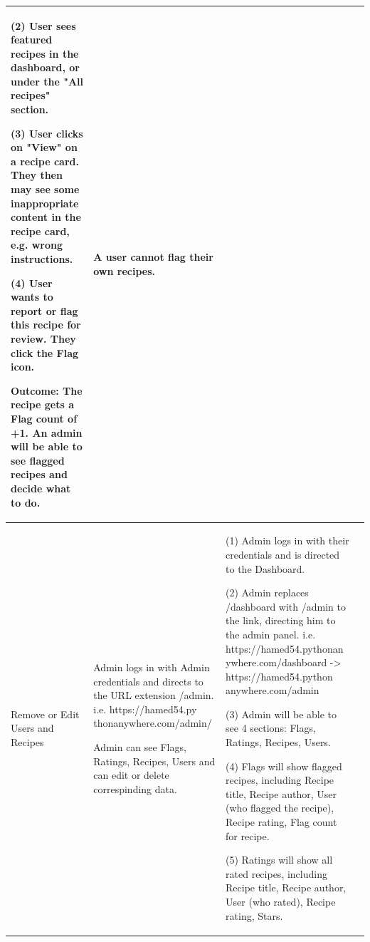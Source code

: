 \documentclass[10pt,a4paper]{article}
\begin{document}
\begin{longtable}{|p{30mm}|p{30mm}|p{40mm}|p{40mm}|}
\vspace{1 mm}

(2) User sees featured recipes in the dashboard, or under the "All recipes" section.

\vspace{1 mm}

(3) User clicks on "View" on a recipe card. They then may see some inappropriate content in the recipe card, e.g. wrong instructions.

\vspace{1 mm}

(4) User wants to report or flag this recipe for review. They click the Flag icon.

Outcome: The recipe gets a Flag count of +1. An admin will be able to see flagged recipes and decide what to do.
&
A user cannot flag their own recipes. \\







\hline
Remove or Edit Users and Recipes 
&
Admin logs in with Admin credentials and directs to the URL extension /admin. i.e. https://hamed54.py
thonanywhere.com/admin/ 

Admin can see Flags, Ratings, Recipes, Users and can edit or delete correspinding data.  
&
(1) Admin logs in with their credentials and is directed to the Dashboard.  

\vspace{1 mm}

(2) Admin replaces /dashboard with /admin to the link, directing him to the admin panel. i.e. https://hamed54.pythonan
ywhere.com/dashboard -> https://hamed54.python
anywhere.com/admin

\vspace{1 mm}

(3) Admin will be able to see 4 sections: Flags, Ratings, Recipes, Users. 

\vspace{1 mm}

(4) Flags will show flagged recipes, including Recipe title, Recipe author, User (who flagged the recipe), Recipe rating, Flag count for recipe.

\vspace{1 mm}

(5) Ratings will show all rated recipes, including Recipe title, Recipe author, User (who rated), Recipe rating, Stars.

\vspace{1 mm}


\end{longtable}
\end{document}
